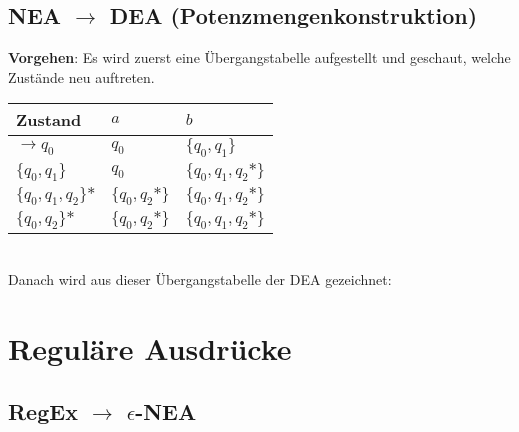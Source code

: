 \documentclass{book}
\begin{document}
\subsection{NEA $\rightarrow$ DEA (Potenzmengenkonstruktion)}
\begin{figure}
    \centering
    \begin{transitiongraph}[fa]
    \end{transitiongraph}
    \label{graph:NEA_LaTeX}
\end{figure}
\textbf{Vorgehen}: Es wird zuerst eine Übergangstabelle aufgestellt und geschaut, welche Zustände neu auftreten.
\begin{table}[]
\begin{tabular}{|l|l|l|}
\hline
Zustand             & $a$              & $b$                   \\
\hline
$\to q_0$           & $q_0$           & $\{q_0,q_1\}$       \\
\hline
$\{q_0,q_1\}$       & $q_0$           & $\{q_0,q_1,q_2\mbox{*}\}$ \\
\hline
$\{q_0,q_1,q_2\}\mbox{*}$ & $\{q_0,q_2\mbox{*}\}$ & $\{q_0,q_1,q_2\mbox{*}\}$   \\
\hline
$\{q_0,q_2\}\mbox{*}$      & $\{q_0,q_2\mbox{*}\}$ & $\{q_0,q_1,q_2\mbox{*}\}$ \\
\hline
\end{tabular}
\end{table}\\
Danach wird aus dieser Übergangstabelle der DEA gezeichnet:\\
\begin{figure}[H]
    \centering
    \begin{transitiongraph}[fa]
    \end{transitiongraph}
    \label{graph:NEA_LaTeX}
\end{figure}

\section{Reguläre Ausdrücke}
\subsection{RegEx $\rightarrow$ $\epsilon$-NEA}
\end{document}
